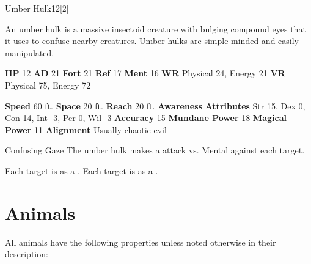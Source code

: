   \begin{monsection}{Umber Hulk}{12}[2]
    \vspace{-1em}\vspace{-1em}
    \vspace{0em}

    
    An umber hulk is a massive insectoid creature with bulging compound eyes that it uses to
    confuse nearby creatures. Umber hulks are simple-minded and easily manipulated.
  
    

    \begin{spellcontent}
      \begin{spelltargetinginfo}
        \pari \textbf{HP} 12 \monsep
          \textbf{AD} 21 \monsep
          \textbf{Fort} 21 \monsep
          \textbf{Ref} 17 \monsep
          \textbf{Ment} 16
        \pari \textbf{WR} Physical 24, Energy 21 \monsep
        \textbf{VR} Physical 75, Energy 72
        
      \end{spelltargetinginfo}
    \end{spellcontent}
    \begin{monsterfooter}
      \pari \textbf{Speed} 60 ft. \monsep
        \textbf{Space} 20 ft. \monsep
        \textbf{Reach} 20 ft.
      \pari \textbf{Awareness} 
      \pari \textbf{Attributes}
        Str 15, Dex 0,
        Con 14, Int -3,
        Per 0, Wil -3
      \pari \textbf{Accuracy} 15 \monsep
        \textbf{Mundane Power} 18 \monsep
      \textbf{Magical Power} 11
      \pari \textbf{Alignment} Usually chaotic evil
    \end{monsterfooter}
  \end{monsection}
  \begin{freeability}{Confusing Gaze}
       The umber hulk makes a  attack
        vs. Mental against each target.
    
    \hit Each target is  as a .
    \crit Each target is  as a .
    \end{freeability}
  
        \section{Animals}

        All animals have the following properties unless noted otherwise in their description:
        
